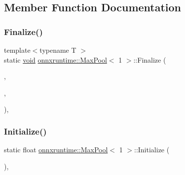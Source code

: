 \subsection{Member Function Documentation}
\mbox{\label{classonnxruntime_1_1MaxPool_3_011_01_4_ac23fd7b4bd131e2aa202b89b5d9565b2}} 
\subsubsection{\texorpdfstring{Finalize()}{Finalize()}}
{\footnotesize\ttfamily template$<$typename T $>$ \\
static \mbox{\hyperlink{mlasi_8h_a88f941d423cb2a819b70a1358982b1a6}{void}} \mbox{\hyperlink{classonnxruntime_1_1MaxPool}{onnxruntime\+::\+Max\+Pool}}$<$ 1 $>$\+::Finalize (\begin{DoxyParamCaption}\item[{const int64\+\_\+t}]{,  }\item[{T \&}]{,  }\item[{const \mbox{\hyperlink{classonnxruntime_1_1PoolProcessContext}{Pool\+Process\+Context}} \&}]{ }\end{DoxyParamCaption})\hspace{0.3cm}{\ttfamily [inline]}, {\ttfamily [static]}}

\mbox{\label{classonnxruntime_1_1MaxPool_3_011_01_4_a367e8d3ad38fd5a76cf422ef6915b104}} 
\subsubsection{\texorpdfstring{Initialize()}{Initialize()}}
{\footnotesize\ttfamily static float \mbox{\hyperlink{classonnxruntime_1_1MaxPool}{onnxruntime\+::\+Max\+Pool}}$<$ 1 $>$\+::Initialize (\begin{DoxyParamCaption}{ }\end{DoxyParamCaption})\hspace{0.3cm}{\ttfamily [inline]}, {\ttfamily [static]}}

